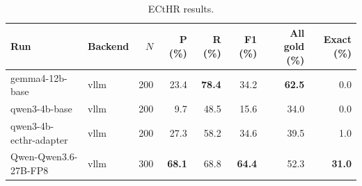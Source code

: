 \begin{table}[htbp]
  \centering
  \begin{tabular}{llrrrrrr}
    \toprule
    Run & Backend & $N$ & P (\%) & R (\%) & F1 (\%) & All gold (\%) & Exact (\%) \\
    \midrule
    gemma4-12b-base & vllm & 200 & 23.4 & \textbf{78.4} & 34.2 & \textbf{62.5} & 0.0 \\
    qwen3-4b-base & vllm & 200 & 9.7 & 48.5 & 15.6 & 34.0 & 0.0 \\
    qwen3-4b-ecthr-adapter & vllm & 200 & 27.3 & 58.2 & 34.6 & 39.5 & 1.0 \\
    Qwen-Qwen3.6-27B-FP8 & vllm & 300 & \textbf{68.1} & 68.8 & \textbf{64.4} & 52.3 & \textbf{31.0} \\
    \bottomrule
  \end{tabular}
  \caption{ECtHR results.}
  \label{tab:ecthr}
\end{table}
